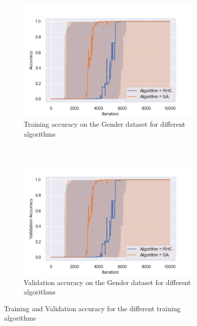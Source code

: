 \documentclass[10pt]{article}
\begin{document}
			\begin{figure}[h]
				\centering
				\begin{subfigure}[t]{0.45\columnwidth}
					\centering
					\includegraphics[width=\linewidth]{../graphics/g_all_Iteration_Error_Algorithm.png}
					\caption{Training accuracy on the Gender dataset for different algorithms}
					\label{g:all_test}
				\end{subfigure}
				~
				\begin{subfigure}[t]{0.45\columnwidth}
					\centering
					\includegraphics[width=1\linewidth]{../graphics/g_all_Iteration_Test_Error_Algorithm.png}
					\caption{Validation accuracy on the Gender dataset for different algorithms}
					\label{g:all_val}
				\end{subfigure}
				\caption{Training and Validation accuracy for the different training algorithms}
				\label{g:all}
			\end{figure}
\end{document}
